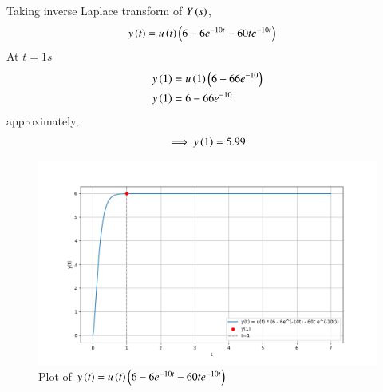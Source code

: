 \documentclass[journal,12pt,twocolumn]{IEEEtran}
\theoremstyle{remark}
\begin{document}
    Taking inverse Laplace transform of $Y\left(s\right)$,
    \begin{align}
	    y\left(t\right) &= u\left(t\right) \left(6-6e^{-10t}-60te^{-10t}\right)
    \end{align}
    At $t=1s$ 
    \begin{align}
        y\left(1\right) &=u\left(1\right) \left(6-66e^{-10}\right)\\
        y\left(1\right) &=6-66e^{-10}
    \end{align}
    approximately,
    \begin{align}
	    \implies y\left(1\right) =5.99
    \end{align}
    
   \begin{figure}[h]
    \centering  

\includegraphics[width=\columnwidth]{2023/BM/54/figs/plot.png}

    \centering
    \caption{Plot of $y\left(t\right) = u\left(t\right) \left(6-6e^{-10t}-60te^{-10t}\right)$}
\end{figure}
\end{document}
